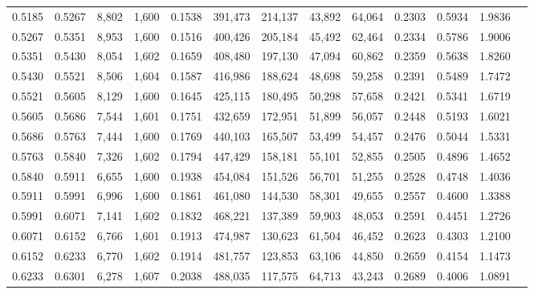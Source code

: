 \begin{tabular}{rrrrrrrrrrrrr}
0.5185 & 0.5267 &  8,802 & 1,600 &                                     0.1538 & 391,473 & 214,137 &  43,892 &  64,064 & 0.2303 & 0.5934 & 1.9836 \\
0.5267 & 0.5351 &  8,953 & 1,600 &                                     0.1516 & 400,426 & 205,184 &  45,492 &  62,464 & 0.2334 & 0.5786 & 1.9006 \\
0.5351 & 0.5430 &  8,054 & 1,602 &                                     0.1659 & 408,480 & 197,130 &  47,094 &  60,862 & 0.2359 & 0.5638 & 1.8260 \\
0.5430 & 0.5521 &  8,506 & 1,604 &                                     0.1587 & 416,986 & 188,624 &  48,698 &  59,258 & 0.2391 & 0.5489 & 1.7472 \\
0.5521 & 0.5605 &  8,129 & 1,600 &                                     0.1645 & 425,115 & 180,495 &  50,298 &  57,658 & 0.2421 & 0.5341 & 1.6719 \\
0.5605 & 0.5686 &  7,544 & 1,601 &                                     0.1751 & 432,659 & 172,951 &  51,899 &  56,057 & 0.2448 & 0.5193 & 1.6021 \\
0.5686 & 0.5763 &  7,444 & 1,600 &                                     0.1769 & 440,103 & 165,507 &  53,499 &  54,457 & 0.2476 & 0.5044 & 1.5331 \\
0.5763 & 0.5840 &  7,326 & 1,602 &                                     0.1794 & 447,429 & 158,181 &  55,101 &  52,855 & 0.2505 & 0.4896 & 1.4652 \\
0.5840 & 0.5911 &  6,655 & 1,600 &                                     0.1938 & 454,084 & 151,526 &  56,701 &  51,255 & 0.2528 & 0.4748 & 1.4036 \\
0.5911 & 0.5991 &  6,996 & 1,600 &                                     0.1861 & 461,080 & 144,530 &  58,301 &  49,655 & 0.2557 & 0.4600 & 1.3388 \\
0.5991 & 0.6071 &  7,141 & 1,602 &                                     0.1832 & 468,221 & 137,389 &  59,903 &  48,053 & 0.2591 & 0.4451 & 1.2726 \\
0.6071 & 0.6152 &  6,766 & 1,601 &                                     0.1913 & 474,987 & 130,623 &  61,504 &  46,452 & 0.2623 & 0.4303 & 1.2100 \\
0.6152 & 0.6233 &  6,770 & 1,602 &                                     0.1914 & 481,757 & 123,853 &  63,106 &  44,850 & 0.2659 & 0.4154 & 1.1473 \\
0.6233 & 0.6301 &  6,278 & 1,607 &                                     0.2038 & 488,035 & 117,575 &  64,713 &  43,243 & 0.2689 & 0.4006 & 1.0891 \\

\end{tabular}
